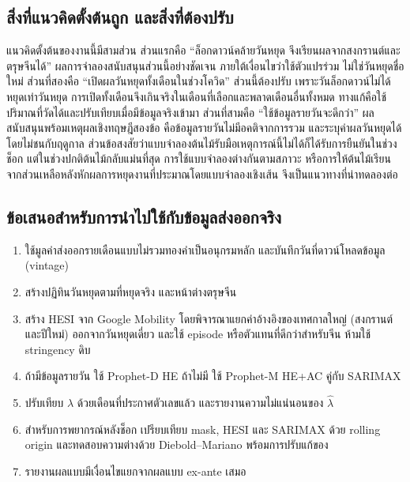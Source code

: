 \documentclass{article}
\theoremstyle{definition}
\begin{document}
\subsection{สิ่งที่แนวคิดตั้งต้นถูก และสิ่งที่ต้องปรับ}
แนวคิดตั้งต้นของงานนี้มีสามส่วน ส่วนแรกคือ “ล็อกดาวน์คล้ายวันหยุด จึงเรียนผลจากสงกรานต์และตรุษจีนได้” ผลการจำลองสนับสนุนส่วนนี้อย่างชัดเจน ภายใต้เงื่อนไขว่าใช้ตัวแปรร่วม ไม่ใช่วันหยุดชื่อใหม่ ส่วนที่สองคือ “เปิดผลวันหยุดทั้งเดือนในช่วงโควิด” ส่วนนี้ต้องปรับ เพราะวันล็อกดาวน์ไม่ได้หยุดเท่าวันหยุด การเปิดทั้งเดือนจึงเกินจริงในเดือนที่เลือกและพลาดเดือนอื่นทั้งหมด ทางแก้คือใช้ปริมาณที่วัดได้และปรับเทียบเมื่อมีข้อมูลจริงเข้ามา ส่วนที่สามคือ “ใช้ข้อมูลรายวันจะดีกว่า” ผลสนับสนุนพร้อมเหตุผลเชิงทฤษฎีสองข้อ คือข้อมูลรายวันไม่มีอคติจากการรวม และระบุค่าผลวันหยุดได้โดยไม่ชนกับฤดูกาล ส่วนข้อสงสัยว่าแบบจำลองต้นไม้รับมือเหตุการณ์นี้ไม่ได้ก็ได้รับการยืนยันในช่วงช็อก แต่ในช่วงปกติต้นไม้กลับแม่นที่สุด การใช้แบบจำลองต่างกันตามสภาวะ หรือการให้ต้นไม้เรียนจากส่วนเหลือหลังหักผลการหยุดงานที่ประมาณโดยแบบจำลองเชิงเส้น จึงเป็นแนวทางที่น่าทดลองต่อ

\subsection{ข้อเสนอสำหรับการนำไปใช้กับข้อมูลส่งออกจริง}
\begin{enumerate}
\item ใช้มูลค่าส่งออกรายเดือนแบบไม่รวมทองคำเป็นอนุกรมหลัก และบันทึกวันที่ดาวน์โหลดข้อมูล (vintage)
\item สร้างปฏิทินวันหยุดตามที่หยุดจริง และหน้าต่างตรุษจีน
\item สร้าง HESI จาก Google Mobility โดยพิจารณาแยกค่าอ้างอิงของเทศกาลใหญ่ (สงกรานต์และปีใหม่) ออกจากวันหยุดเดี่ยว และใช้ episode หรือตัวแทนที่ดีกว่าสำหรับจีน ห้ามใช้ stringency ดิบ
\item ถ้ามีข้อมูลรายวัน ใช้ Prophet-D HE ถ้าไม่มี ใช้ Prophet-M HE+AC คู่กับ SARIMAX
\item ปรับเทียบ $\lambda$ ด้วยเดือนที่ประกาศตัวเลขแล้ว และรายงานความไม่แน่นอนของ $\hat\lambda$
\item สำหรับการพยากรณ์หลังช็อก เปรียบเทียบ mask, HESI และ SARIMAX ด้วย rolling origin และทดสอบความต่างด้วย Diebold--Mariano \citep{diebold1995comparing} พร้อมการปรับแก้ของ \citet{harvey1997testing}
\item รายงานผลแบบมีเงื่อนไขแยกจากผลแบบ ex-ante เสมอ
\end{enumerate}
\end{document}

